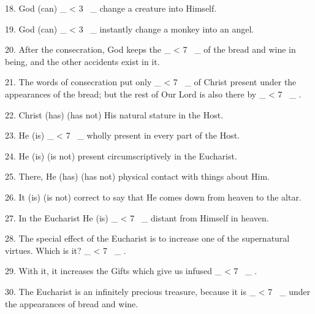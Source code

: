 \documentclass[a5paper]{article}
\newcommand\textjarman[1]{{\jarman #1}}
\newcounter{z}
\newcommand\spaces[1]{ \_\loop \ifnum\value{z} < #1
~\_%
\stepcounter{z}%
\repeat%
\setcounter{z}{0}}
\begin{document}
18.  God  (\textjarman{can})  \spaces{3}
change a creature into Himself. 

19. God (\textjarman{can}) \spaces{3}  instantly  change  a
monkey into an angel. 

20. After the consecration, God keeps the \spaces{7}  of
the bread and wine in being, and the other accidents exist in  it.  

21.  The
words of  consecration  put  only  \spaces{7}  of  Christ  present  under  the
appearances of the bread; but  the  rest  of  Our  Lord  is  also  there  by
\spaces{7}. 

22. Christ (\textjarman{has}) (\textjarman{has not}) His natural stature in  the  Host. 

23. 
He (\textjarman{is}) \spaces{7} wholly present in every part of the Host. 

24. He  (\textjarman{is})  (\textjarman{is
not}) present circumscriptively in the Eucharist. 

25. There,  He  (\textjarman{has})  (\textjarman{has
not}) physical contact with things about Him. 

26. It (\textjarman{is})  (\textjarman{is  not})  correct
to say that He comes down from heaven to the altar. 

27. In the Eucharist  He
(\textjarman{is}) \spaces{7} distant from Himself in heaven. 

28. The special effect of  the
Eucharist is to increase one of  the  supernatural  virtues.  Which  is  it?
\spaces{7}. 

29. With  it,  it  increases  the  Gifts  which  give  us  infused
\spaces{7}. 

30. The Eucharist is an infinitely precious treasure,  because  it
is \spaces{7} under the appearances of bread and wine.

\newpage
\end{document}

